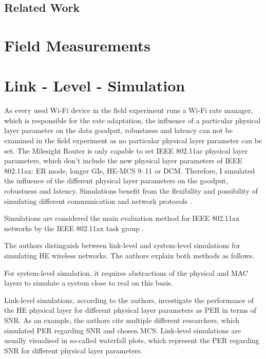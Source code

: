 \documentclass[]{nsm-thesis}
\begin{document}
\section{Related Work}





\chapter{Field Measurements}









\chapter{Link - Level - Simulation}

As every used Wi-Fi device in the field experiment runs a Wi-Fi rate manager, which is responsible for the rate adaptation,
the influence of a particular physical layer parameter on the data goodput, robustness and latency can not be examined in the field experiment as no particular physical layer parameter can be set.
The Milesight Router is only capable to set IEEE 802.11ac physical layer parameters, which don't include the new physical layer parameters of IEEE 802.11ax:
\ac{ER} mode, longer \ac{GI}s, HE-\ac{MCS} \numrange{9}{11} or \ac{DCM}.
Therefore, I simulated the influence of the different physical layer parameters on the goodput, robustness and latency.
Simulations benefit from the flexibility and possibility of simulating different communication and network protocols \cite{kumar_simulators_2012}.

Simulations are considered the main evaluation method for IEEE 802.11ax networks by the IEEE 802.11ax task group \cite{omar_survey_2016}.

The authors distinguish between link-level and system-level simulations for simulating \ac{HE} wireless networks.
The authors explain both methods as follows.

For system-level simulation, it requires abstractions of the physical and MAC layers to simulate a system close to
real on this basis.

Link-level simulations, according to the authors,
investigate the performance of the HE physical layer for different physical layer parameters as \ac{PER} in terms of \ac{SNR}.
As an example, the authors cite multiple different researchers, which simulated \ac{PER} regarding \ac{SNR} and chosen \ac{MCS}.
Link-level simulations are usually visualised in so-called waterfall plots, which represent the \ac{PER} regarding \ac{SNR} for
different physical layer parameters.
\end{document}
